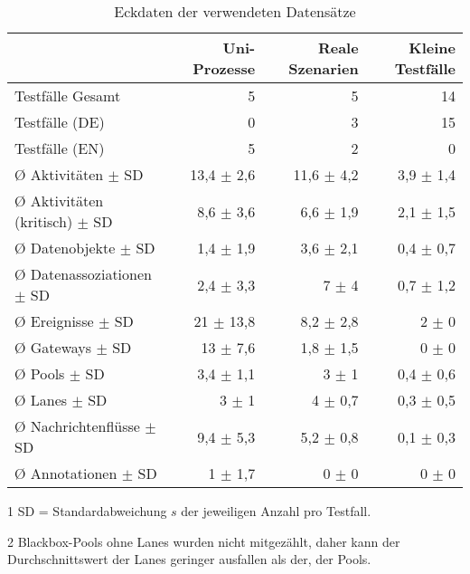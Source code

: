 \begin{table}[htbp]
    \centering
    \begin{threeparttable}
    \caption{Eckdaten der verwendeten Datensätze}
    \label{tab:datensaetze-eckdaten}
    \begin{tabular}{l r r r}
        \toprule
        & Uni-Prozesse & Reale Szenarien & Kleine Testfälle \\
        \midrule
        Testfälle Gesamt                  & 5  & 5 & 14 \\
        Testfälle (DE)                    & 0 & 3 & 15 \\
        Testfälle (EN)                    & 5 & 2 & 0 \\
        Ø Aktivitäten $\pm$ SD\tnote{1}   & 13,4 $\pm$ 2,6 & 11,6 $\pm$ 4,2 & 3,9 $\pm$ 1,4 \\
        Ø Aktivitäten (kritisch) $\pm$ SD & 8,6 $\pm$ 3,6 & 6,6 $\pm$ 1,9 & 2,1 $\pm$ 1,5 \\
        Ø Datenobjekte $\pm$ SD           & 1,4 $\pm$ 1,9 & 3,6 $\pm$ 2,1 & 0,4 $\pm$ 0,7 \\
        Ø Datenassoziationen $\pm$ SD     & 2,4 $\pm$ 3,3 & 7 $\pm$ 4 & 0,7 $\pm$ 1,2 \\
        Ø Ereignisse $\pm$ SD             & 21 $\pm$ 13,8 & 8,2 $\pm$ 2,8 & 2 $\pm$ 0 \\
        Ø Gateways $\pm$ SD               & 13 $\pm$ 7,6 & 1,8 $\pm$ 1,5 & 0 $\pm$ 0 \\
        Ø Pools $\pm$ SD                  & 3,4 $\pm$ 1,1 & 3 $\pm$ 1 & 0,4 $\pm$ 0,6 \\
        Ø Lanes $\pm$ SD\tnote{2}         & 3 $\pm$ 1 & 4 $\pm$ 0,7 & 0,3 $\pm$ 0,5 \\
        Ø Nachrichtenflüsse $\pm$ SD      & 9,4 $\pm$ 5,3 & 5,2 $\pm$ 0,8 & 0,1 $\pm$ 0,3 \\
        Ø Annotationen $\pm$ SD           & 1 $\pm$ 1,7 & 0 $\pm$ 0 & 0 $\pm$ 0 \\
        \bottomrule
    \end{tabular}
    \begin{tablenotes}
        \item[1] SD = Standardabweichung $s$ der jeweiligen Anzahl pro Testfall.
        \item[2] Blackbox-Pools ohne Lanes wurden nicht mitgezählt, daher kann der Durchschnittswert der Lanes geringer ausfallen als der, der Pools.
    \end{tablenotes}
    \end{threeparttable}
\end{table}